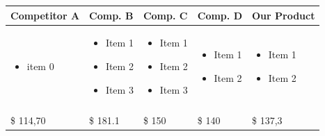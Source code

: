 \documentclass[11pt,titlepage]{article}
\begin{document}
\begin{tabular}{| m{80 pt} | m{80 pt} | m{80 pt} | m{80 pt} | m{80 pt} |}
  Competitor A & Comp. B & Comp. C & Comp. D & Our Product\\\hline
  \begin{itemize} \tiny \item  item 0\end{itemize} & 
    \begin{itemize} \tiny 
    \item Item 1 
    \item Item 2
    \item Item 3
    \end{itemize} & 
    \begin{itemize} \tiny 
    \item Item 1
    \item Item 2
    \item Item 3 \end{itemize}& 
    \begin{itemize} \tiny 
    \item Item 1
    \item Item 2
    \end{itemize}& 
    \begin{itemize} \tiny 
    \item Item 1
    \item Item 2
    \end{itemize}\\
    & & & &\\ \hline
    \$ 114,70 & \$ 181.1 & \$ 150 & \$ 140 & \$ 137,3\\\hline
\end{tabular}
\end{document}
